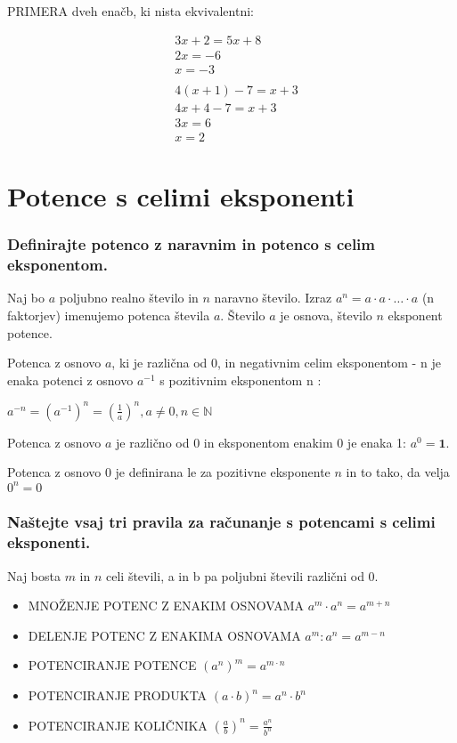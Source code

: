 \documentclass{article}
\begin{document}
PRIMERA dveh enačb, ki nista ekvivalentni:

$$
\begin{aligned}
& 3 x+2=5 x+8 \\
& 2 x=-6 \\
& x=-3 \\
& \\
& 4(x+1)-7=x+3 \\
& 4 x+4-7=x+3 \\
& 3 x=6 \\
& x=2
\end{aligned}
$$

\section{Potence s celimi eksponenti}
\subsubsection*{Definirajte potenco z naravnim in potenco s celim eksponentom.}

Naj bo $a$ poljubno realno število in $n$ naravno število. Izraz $a^{n}=a \cdot a \cdot \ldots \cdot a$ (n faktorjev) imenujemo potenca števila $a$. Število $a$ je osnova, število $n$ eksponent potence.

Potenca z osnovo $a$, ki je različna od $0$, in negativnim celim eksponentom - $\mathrm{n}$ je enaka potenci z osnovo $a^{-1}$ s pozitivnim eksponentom $\mathrm{n}$ :

$a^{-n}=\left(a^{-1}\right)^{n}=\left(\frac{1}{a}\right)^{n}, a \neq 0, n \in \mathbb{N}$

Potenca z osnovo $a$ je različno od 0 in eksponentom enakim 0 je enaka 1: $a^{0}=\mathbf{1}$.

Potenca z osnovo 0 je definirana le za pozitivne eksponente $n$ in to tako, da velja $0^{n}=0$

\subsubsection*{Naštejte vsaj tri pravila za računanje s potencami s celimi eksponenti.}

Naj bosta $m$ in $n$ celi števili, a in b pa poljubni števili različni od 0.

\begin{itemize}
 

\item MNOŽENJE POTENC Z ENAKIM OSNOVAMA
$a^{m} \cdot a^{n}=a^{m+n}$

\item DELENJE POTENC Z ENAKIMA OSNOVAMA
$a^{m}: a^{n}=a^{m-n}$

\item POTENCIRANJE POTENCE
$\left(a^{n}\right)^{m}=a^{m \cdot n}$

\item POTENCIRANJE PRODUKTA
$(a \cdot b)^{n}=a^{n} \cdot b^{n}$

\item POTENCIRANJE KOLIČNIKA
$\left(\frac{a}{b}\right)^{n}=\frac{a^{n}}{b^{n}}$

\end{itemize}
\end{document}
